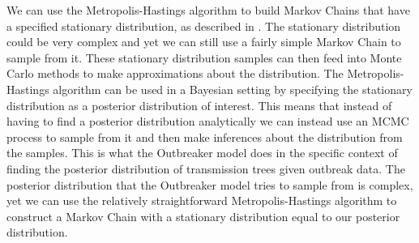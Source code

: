 \documentclass[11pt,a4paper]{report}
\begin{document}
We can use the Metropolis-Hastings algorithm to build Markov Chains that have a specified stationary distribution, as described in \citet{Gilks96}. The stationary distribution could be very complex and yet we can still use a fairly simple Markov Chain to sample from it. These stationary distribution samples can then feed into Monte Carlo methods to make approximations about the distribution. The Metropolis-Hastings algorithm can be used in a Bayesian setting by specifying the stationary distribution as a posterior distribution of interest. This means that instead of having to find a posterior distribution analytically we can instead use an MCMC process to sample from it and then make inferences about the distribution from the samples. This is what the Outbreaker model does in the specific context of finding the posterior distribution of transmission trees given outbreak data. The posterior distribution that the Outbreaker model tries to sample from is complex, yet we can use the relatively straightforward Metropolis-Hastings algorithm to construct a Markov Chain with a stationary distribution equal to our posterior distribution.
\end{document}
